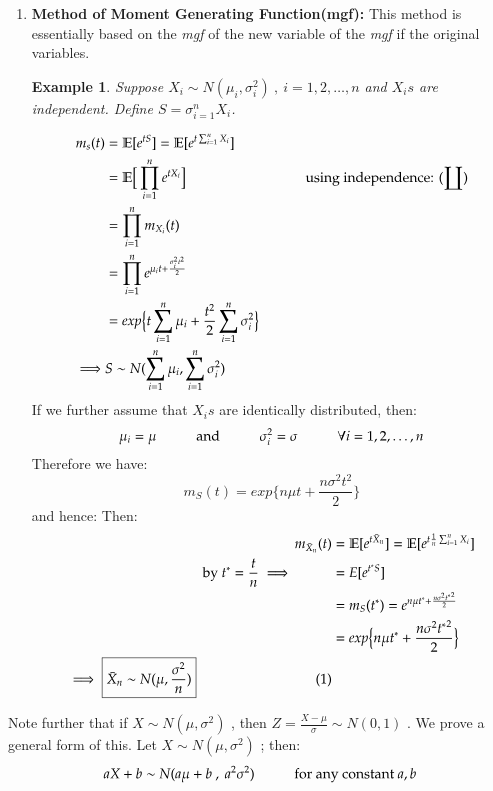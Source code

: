 \documentclass[14pt,twoside,a4paper,fleqn]{article}
\theoremstyle{plain}
\newtheorem*{example*}{Example}
\begin{document}
\begin{enumerate}
\item\textbf{Method of Moment Generating Function(mgf): } This method is essentially based on the \emph{mgf} of the new variable of the \emph{mgf} if the original variables.
	\begin{example*}
		Suppose $X_i\sim N(\mu_{i}, \sigma_i^2)\ ,\ i=1,2,\ldots,n$ and $X_is$ are independent. Define $S=\sigma_{i=1}^n X_i$.
	\end{example*}
	\begin{equation*}
	\begin{split}	
		m_s(t) &=\mathbb{E}[e^{tS}] = \mathbb{E}[e^{t \sum_{i=1}^n X_i}]\\
		&= \mathbb{E}\Big[\prod_{i=1}^n e^{t X_i}\Big]\tab[3cm]\text{using independence: }(\coprod)\\
		&=\prod_{i=1}^n m_{X_i}(t)\\
		&=\prod_{i=1}^n e^{\mu_i t + \frac{\sigma_i^2 t^2}{2}}			\\
		&=exp\Big\{t\sum_{i=1}^n \mu_i + \frac{t^2}{2}\sum_{i=1}^n \sigma_i^2 \Big\}\\
\implies &S\sim N(\sum_{i=1}^n \mu_i, \sum_{i=1}^n \sigma_i^2)
	\end{split}
	\end{equation*}
	If we further assume that $X_is$ are identically distributed, then: $$\mu_i = \mu \hspace*{1cm}\text{and}\hspace*{1cm}\sigma_i^2 = \sigma\hspace*{1cm}\forall i=1,2,\ldots,n$$
	Therefore we have:
	$$
	m_S(t) = exp\Big\{n\mu t + \frac{n\sigma^2 t^2}{2}  \Big\}
	$$
	and hence:
	Then:
	\begin{equation*}
	\begin{split}	
		m_{\bar{X}_n}(t) &= \mathbb{E}[e^{t\bar{X}_n}] = \mathbb{E}[e^{t \frac{1}{n}\sum_{i=1}^n X_i}]\\
		\text{by }t^{*}=\frac{t}{n}\implies\tab&=E[e^{t^{*}S}]\\
		&= m_S(t^{*}) = e^{n\mu t^{*} + \frac{n\sigma^2 {t^{*}}^2}{2}}\\
		&=exp\Big\{n\mu t^{*} + \frac{n\sigma^2 {t^{*}}^2}{2}\Big\}\\
		\implies \text{\boxed{$$\bar{X}_n \sim N(\mu,\frac{\sigma^2}{n})$$}}\tab[3cm](1)
	\end{split}
	\end{equation*}
\end{enumerate}
Note further that if $X\sim N(\mu,\sigma^2)$ , then $Z=\frac{X-\mu}{\sigma} \sim N(0,1)$ . We prove a general form of this. Let $X\sim N(\mu,\sigma^2)$ ; then:
$$
	aX+b \sim N(a\mu +b\ ,\ a^2\sigma^2)\tab \text{for any constant $a,b$}
$$
\end{document}
